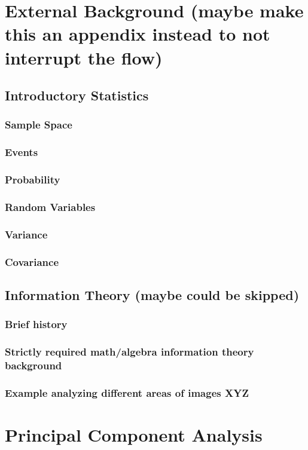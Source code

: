 \documentclass[12pt]{extarticle}
\begin{document}
    \section{External Background (maybe make this an appendix instead to not interrupt the flow)}
    \subsection{Introductory Statistics }
    \subsubsection{Sample Space}
    \subsubsection{Events}
    \subsubsection{Probability}
    \subsubsection{Random Variables}
    \subsubsection{Variance}
    \subsubsection{Covariance}
    \subsection{Information Theory (maybe could be skipped)}
    \subsubsection{Brief history}
    \blindtext
    \subsubsection{Strictly required math/algebra information theory background}
    \blindtext
    \subsubsection{Example analyzing different areas of images XYZ}
    \blindtext
    
    \section{Principal Component Analysis}
\end{document}
